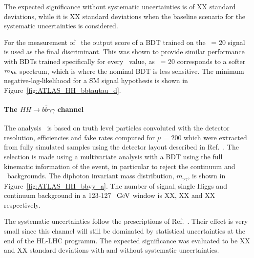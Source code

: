 The expected significance without systematic uncertainties is of XX standard deviations, while it is XX standard deviations when the baseline scenario for the systematic uncertainties is considered.

For the measurement of \kl\ the output score of a BDT trained on the \kl\ = 20 signal is used as the final discriminant. This was shown to provide similar performance with BDTs trained specifically for every \kl\ value, as \kl\ = 20 corresponds to a softer $m_{hh}$ spectrum, which is where the nominal BDT is less sensitive.
The minimum negative-log-likelihood for a SM signal hypothesis is shown in Figure~\ref{fig:ATLAS_HH_bbtautau_d}.




%
\paragraph{The $HH \rightarrow b\bar{b}\gamma\gamma$ channel}


The analysis~\cite{ATLASHHPUBnote} is based on truth level particles convoluted with the detector resolution, efficiencies and fake rates computed for $\mu$ = 200 which were extracted from fully simulated samples using the detector layout described in Ref.~\cite{ITKPixelTDR}. The selection is made using a multivariate analysis with a BDT using the full kinematic information of the event, in particular to reject the continuum and \ttH\ backgrounds. 
The diphoton invariant mass distribution, $\ensuremath{m_{\gamma\gamma}}$, is shown in Figure~\ref{fig:ATLAS_HH_bbyy_a}. The number of signal, single Higgs and continuum background in a 123-127~$~\text{GeV}$ window is XX, XX and XX respectively.

The systematic uncertainties follow the prescriptions of Ref.~\cite{ATLASperformance}. Their effect is very small since this channel will still be dominated by statistical uncertainties at the end of the HL-LHC programm.
The expected significance was evaluated to be XX and XX standard deviations with and without systematic uncertainties.

